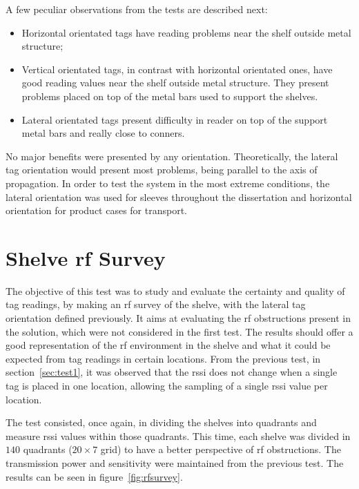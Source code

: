 A few peculiar observations from the tests are described next:

\begin{itemize}
    \item Horizontal orientated tags have reading problems near the shelf outside metal structure;
    \item Vertical orientated tags, in contrast with horizontal orientated ones, have good reading values near the shelf outside metal structure. They present problems placed on top of the metal bars used to support the shelves.
    \item Lateral orientated tags present difficulty in reader on top of the support metal bars and really close to conners.
\end{itemize}

No major benefits were presented by any orientation.
Theoretically, the lateral tag orientation would present most problems, being parallel to the axis of propagation.
In order to test the system in the most extreme conditions, the lateral orientation was used for sleeves throughout the dissertation and horizontal orientation for product cases for transport.

\section{Shelve \acs{rf} Survey}

The objective of this test was to study and evaluate the certainty and quality of tag readings, by making an \ac{rf} survey of the shelve, with the lateral tag orientation defined previously.
It aims at evaluating the \ac{rf} obstructions present in the solution, which were not considered in the first test.
The results should offer a good representation of the \ac{rf} environment in the shelve and what it could be expected from tag readings in certain locations. 
From the previous test, in section~\ref{sec:test1}, it was observed that the \ac{rssi} does not change when a single tag is placed in one location, allowing the sampling of a single \ac{rssi} value per location. 

The test consisted, once again, in dividing the shelves into quadrants and measure \ac{rssi} values within those quadrants. This time, each shelve was divided in $140$ quadrants ($20\times7$ grid) to have a better perspective of \ac{rf} obstructions. The transmission power and sensitivity were maintained from the previous test.
The results can be seen in figure~\ref{fig:rfsurvey}.

